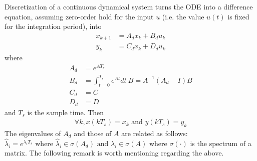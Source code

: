 \documentclass[sigconf]{llncs}
\newcommand{\mat}[1]{{#1}}
\renewcommand{\vec}[1]{{#1}}
\begin{document}
Discretization of a continuous dynamical system turns the ODE into a difference
equation, assuming zero-order hold for the input $\vec{u}$ (i.e. the value $u(t)$
 is fixed for the integration period), %
into
\begin{align}
\label{eq:discretization}
\vec{x}_{k+1} &= \mat{A}_d\vec{x}_k+\mat{B}_d\vec{u}_k\\%
y_k &= \mat{C}_d \vec{x}_ k + \mat{D}_d \vec{u}_ k 
\end{align}
where
\begin{align}
\label{eq:discretize}
\mat{A}_d &= e^{\mat{A} T_s} \\%
\mat{B}_d &= \int_{t = 0}^{T_s} e^{\mat{A} t} dt\ \mat{B} = \mat{A}^{-1} ( \mat{A}_d - \mat{I} ) \mat{B}\\
\mat{C}_d &= \mat{C}\\
\mat{D}_d &= \mat{D} %
\end{align}
and $T_s$ is the sample time. Then
\begin{align*}
\forall k,  \vec{x}(kT_s)=\vec{x}_k \text{ and } \vec{y}(kT_s) = \vec{y}_k
\end{align*}
The eigenvalues of $\vec{A}_d$ %
and those of $\vec{A}$ %
are related as follows:
$\hat{\lambda}_i=e^{\lambda_iT_s} \text{ where } \hat{\lambda}_i \in \sigma(\vec{A}_d) \text{ and } \lambda_i \in \sigma(\vec{A})$
where $\sigma(\cdot)$ is the spectrum of a matrix.
The following remark is worth mentioning regarding the above.
\end{document}
